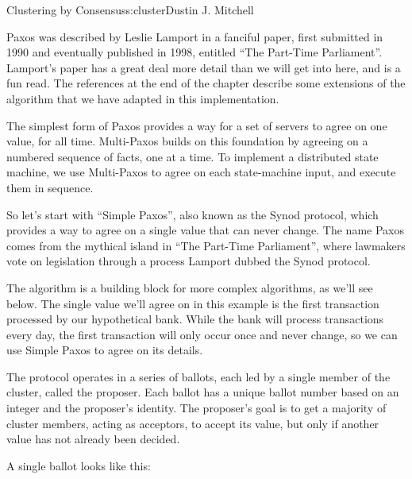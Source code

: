 \begin{aosachapter}{Clustering by Consensus}{s:cluster}{Dustin J. Mitchell}
\label{consensus-by-paxos}

Paxos was described by Leslie Lamport in a fanciful paper, first
submitted in 1990 and eventually published in 1998, entitled ``The
Part-Time Parliament''. Lamport's paper has a great deal more detail
than we will get into here, and is a fun read. The references at the end
of the chapter describe some extensions of the algorithm that we have
adapted in this implementation.

The simplest form of Paxos provides a way for a set of servers to agree
on one value, for all time. Multi-Paxos builds on this foundation by
agreeing on a numbered sequence of facts, one at a time. To implement a
distributed state machine, we use Multi-Paxos to agree on each
state-machine input, and execute them in sequence.

\label{simple-paxos}

So let's start with ``Simple Paxos'', also known as the Synod protocol,
which provides a way to agree on a single value that can never change.
The name Paxos comes from the mythical island in ``The Part-Time
Parliament'', where lawmakers vote on legislation through a process
Lamport dubbed the Synod protocol.

The algorithm is a building block for more complex algorithms, as we'll
see below. The single value we'll agree on in this example is the first
transaction processed by our hypothetical bank. While the bank will
process transactions every day, the first transaction will only occur
once and never change, so we can use Simple Paxos to agree on its
details.

The protocol operates in a series of ballots, each led by a single
member of the cluster, called the proposer. Each ballot has a unique
ballot number based on an integer and the proposer's identity. The
proposer's goal is to get a majority of cluster members, acting as
acceptors, to accept its value, but only if another value has not
already been decided.

A single ballot looks like this:

\begin{verbatim}


\end{verbatim}
\end{aosachapter}
